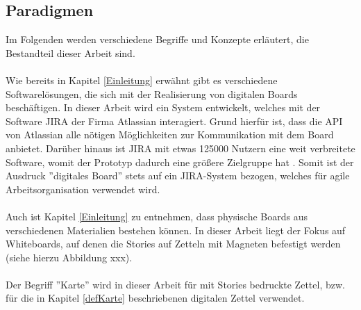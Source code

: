 \documentclass[12pt,titlepage]{scrartcl}
\begin{document}
		\subsection{Paradigmen}
		Im Folgenden werden verschiedene Begriffe und Konzepte erläutert, die Bestandteil dieser Arbeit sind. \\ \\
		Wie bereits in Kapitel \ref{Einleitung} erwähnt gibt es verschiedene Softwarelösungen, die sich mit der Realisierung von digitalen Boards beschäftigen. In dieser Arbeit wird ein System entwickelt, welches mit der Software JIRA der Firma Atlassian interagiert. Grund hierfür ist, dass die API von Atlassian alle nötigen Möglichkeiten zur Kommunikation mit dem Board anbietet. Darüber hinaus ist JIRA mit etwas 125000 Nutzern eine weit verbreitete Software, womit der Prototyp dadurch eine größere Zielgruppe hat \cite{jirarevenue}. Somit ist der Ausdruck ''digitales Board'' stets auf ein JIRA-System bezogen, welches für agile Arbeitsorganisation verwendet wird. \\ \\
		Auch ist Kapitel \ref{Einleitung} zu entnehmen, dass physische Boards aus verschiedenen Materialien bestehen können. In dieser Arbeit liegt der Fokus auf Whiteboards, auf denen die Stories auf Zetteln mit Magneten befestigt werden (siehe hierzu Abbildung xxx). \\ \\
		Der Begriff ''Karte'' wird in dieser Arbeit für mit Stories bedruckte Zettel, bzw. für die in Kapitel \ref{defKarte} beschriebenen digitalen Zettel verwendet. 
\end{document}
